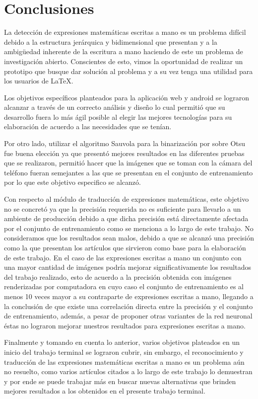 \chapter{Conclusiones}
La detección de expresiones matemáticas escritas a mano es un problema difícil debido a la estructura jerárquica y bidimensional que presentan y a la ambigüedad inherente de la escritura a mano haciendo de este un problema de investigación abierto. Conscientes de esto, vimos la oportunidad de realizar un prototipo que busque dar solución al problema y a su vez tenga una utilidad para los usuarios de \LaTeX.

Los objetivos específicos planteados para la aplicación web y android se lograron alcanzar a través de un correcto análisis y diseño lo cual permitió que su desarrollo fuera lo más ágil posible al elegir las mejores tecnologías para su elaboración de acuerdo a las necesidades que se tenían.

Por otro lado, utilizar el algoritmo Sauvola para la binarización por sobre Otsu fue buena elección ya que presentó mejores resultados en las diferentes pruebas que se realizaron, permitió hacer que la imágenes que se toman con la cámara del teléfono fueran semejantes a las que se presentan en el conjunto de entrenamiento por lo que este objetivo especifico se alcanzó.

Con respecto al módulo de traducción de expresiones matemáticas, este objetivo no se concretó ya que la precisión requerida no es suficiente para llevarlo a un ambiente de producción debido a que dicha precisión está directamente afectada por el conjunto de entrenamiento como se menciona a lo largo de este trabajo. No consideramos que los resultados sean malos, debido a que se alcanzó una precisión como la que presentan los artículos que sirvieron como base para la elaboración de este trabajo. En el caso de las expresiones escritas a mano un conjunto con una mayor cantidad de imágenes podría mejorar significativamente los resultados del trabajo realizado, esto de acuerdo a la precisión obtenida con imágenes renderizadas por computadora en cuyo caso el conjunto de entrenamiento es al menos 10 veces mayor a su contraparte de expresiones escritas a mano, llegando a la conclusión de que existe una correlación directa entre la precisión y el conjunto de entrenamiento, además, a pesar de proponer otras variantes de la red neuronal éstas no lograron mejorar nuestros resultados para expresiones escritas a mano.

Finalmente y tomando en cuenta lo anterior, varios objetivos plateados en un inicio del trabajo terminal se lograron cubrir, sin embargo, el reconocimiento y traducción de las expresiones matemáticas escritas a mano es un problema aún no resuelto, como varios artículos citados a lo largo de este trabajo lo demuestran y por ende se puede trabajar más en buscar nuevas alternativas que brinden mejores resultados a los obtenidos en el presente trabajo terminal.

